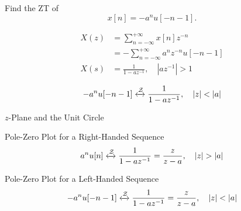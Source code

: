 \begin{frame}[t]{}
    \begin{example}
        Find the ZT of
        \begin{equation*}
            x[n] = -a^nu[-n-1].
        \end{equation*}
    \end{example}
    \pause
    {
        \begin{solution}\end{solution}
            \begin{align*}
                X(z) &= \sum_{n=-\infty}^{+\infty}x[n]z^{-n}\\
                &= -\sum_{n=-\infty}^{+\infty}a^nz^{-n}u[-n-1]\\
                X(s) &= \frac{1}{1-az^{-1}}, \quad |az^{-1}|>1\\
            \end{align*}
            \pause
            \begin{equation*}
                -a^nu[-n-1] \xleftrightarrow{\mathcal{Z}}   \frac{1}{1-az^{-1}}, \quad |z|< |a|
            \end{equation*}

    }
\end{frame}


\begin{frame}{$z$-Plane and the Unit Circle}
    {
        \begin{center}
            
        \end{center}
    }
\end{frame}

\begin{frame}{Pole-Zero Plot for a Right-Handed Sequence}
    \begin{equation*}
        a^nu[n] \xleftrightarrow{\mathcal{Z}}   \frac{1}{1-az^{-1}} = \frac{z}{z-a}, \quad |z|> |a|
    \end{equation*}
    {
        \begin{center}
            
        \end{center}
    }
\end{frame}


\begin{frame}{Pole-Zero Plot for a Left-Handed Sequence}
    \begin{equation*}
        -a^nu[-n-1] \xleftrightarrow{\mathcal{Z}}   \frac{1}{1-az^{-1}} = \frac{z}{z-a},  \quad |z|< |a|
    \end{equation*}
    {
        \begin{center}
            
        \end{center}
    }
\end{frame}

